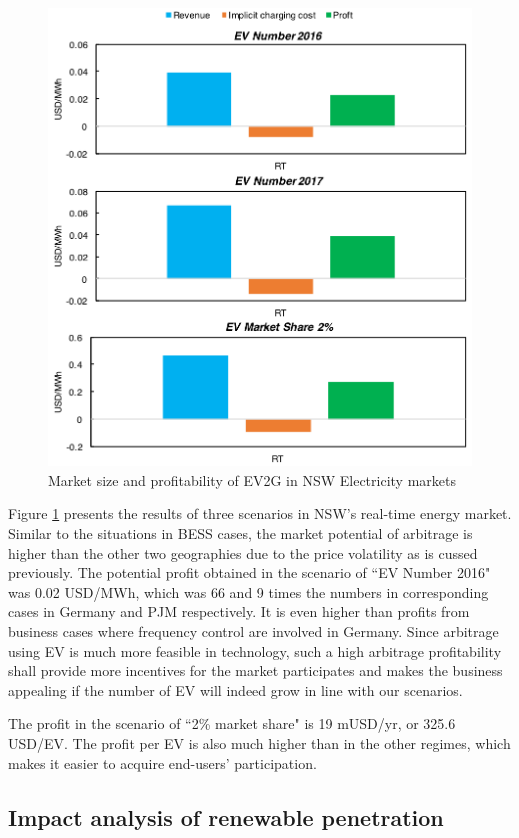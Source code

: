 \begin{figure}[h!]
	\centering
	\includegraphics[width=0.8\linewidth]{Figures/NSW_EV_profit}
	\caption{Market size and profitability of EV2G in NSW Electricity markets}
	\label{fig:NSW_EV}
\end{figure}

Figure \ref{fig:NSW_EV} presents the results of three scenarios in NSW's real-time energy market. Similar to the situations in BESS cases, the market potential of arbitrage is higher than the other two geographies due to the price volatility as is cussed previously. The potential profit obtained in the scenario of ``EV Number 2016" was 0.02 USD/MWh, which was 66 and 9 times the numbers in corresponding cases in Germany and PJM respectively. It is even higher than profits from business cases where frequency control are involved in Germany. Since arbitrage using EV is much more feasible in technology, such a high arbitrage profitability shall provide more incentives for the market participates and makes the business appealing if the number of EV will indeed grow in line with our scenarios.

The profit in the scenario of ``2\% market share" is 19 mUSD/yr, or 325.6 USD/EV. The profit per EV is also much higher than in the other regimes, which makes it easier to acquire end-users' participation.


\subsection{Impact analysis of renewable penetration}
\label{sec:impact-market-condition}

